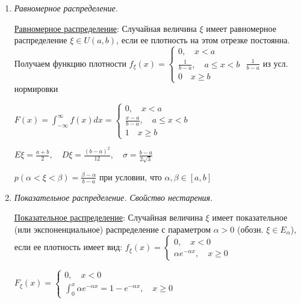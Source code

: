 \begin{enumerate}
    Медианой $Me$ абсолютно непрерывной случайной величины $\xi$ называется значение случайной величины $\xi$, такое что $p(\xi < Me) = p(\xi > Me) = \frac{1}{2}$
    
    Модой $Mo$ случайной величины $\xi$ называется точка локального максимума плотности

    \item \textit{Равномерное распределение. }

    \hyperlink{uniformdistribution}{Равномерное распределение}: Случайная величина $\xi$ имеет равномерное распределение $\xi \in U(a, b)$, если ее плотность
    на этом отрезке постоянна. Получаем функцию плотности $f_\xi(x) = \begin{cases}0, \quad x < a \\ \frac{1}{b - a}, \quad a \leq x < b \\ 0 \quad x \geq b\end{cases}$ \hfill {\scriptsize $\frac{1}{b - a}$ из усл. нормировки}

    $F(x) = \int_{-\infty}^\infty f(x)dx = \begin{cases}0, \quad x < a \\ \frac{x - a}{b - a}, \quad a \leq x < b \\ 1 \quad x \geq b\end{cases}$

    $E\xi = \frac{a + b}{2}, \quad D\xi = \frac{(b - a)^2}{12}, \quad \sigma = \frac{b - a}{2\sqrt{3}}$

    $p(\alpha < \xi < \beta) = \frac{\beta - \alpha}{b - a}$ при условии, что $\alpha, \beta \in [a, b]$

    \item \textit{Показательное распределение. Свойство нестарения.}

    \hyperlink{exponentialdistribution}{Показательное распределение}: Случайная величина $\xi$ имеет показательное (или экспоненциальное) распределение с параметром $\alpha > 0$ (обозн. $\xi \in E_\alpha$),
    если ее плотность имеет вид: $f_\xi(x) = \begin{cases}0, \quad x < 0 \\ \alpha e^{-\alpha x}, \quad x \geq 0\end{cases}$

    $F_\xi(x) = \begin{cases}0, \quad x < 0 \\ \int_0^x \alpha e^{-\alpha x} = 1 - e^{-\alpha x}, \quad x \geq 0\end{cases}$


\end{enumerate}
